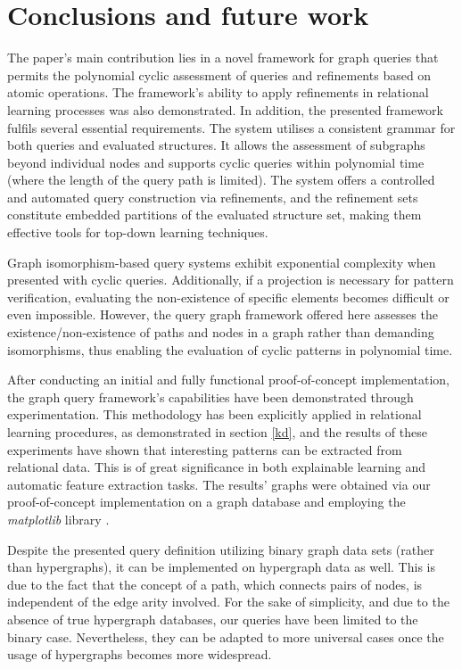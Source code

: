 \documentclass{article}%
\begin{document}
%
\clearpage%
\section{Conclusions and future work}
\label{cafw}

The paper's main contribution lies in a novel framework for graph queries that permits the polynomial cyclic assessment of queries and refinements based on atomic operations. The framework's ability to apply refinements in relational learning processes was also demonstrated. In addition, the presented framework fulfils several essential requirements. The system utilises a consistent grammar for both queries and evaluated structures. It allows the assessment of subgraphs beyond individual nodes and supports cyclic queries within polynomial time (where the length of the query path is limited). The system offers a controlled and automated query construction via refinements, and the refinement sets constitute embedded partitions of the evaluated structure set, making them effective tools for top-down learning techniques.

Graph isomorphism-based query systems exhibit exponential complexity when presented with cyclic queries. Additionally, if a projection is necessary for pattern verification, evaluating the non-existence of specific elements becomes difficult or even impossible. However, the query graph framework offered here assesses the existence/non-existence of paths and nodes in a graph rather than demanding isomorphisms, thus enabling the evaluation of cyclic patterns in polynomial time. 

After conducting an initial and fully functional proof-of-concept implementation, the graph query framework's capabilities have been demonstrated through experimentation. This methodology has been explicitly applied in relational learning procedures, as demonstrated in section \ref{kd}, and the results of these experiments have shown that interesting patterns can be extracted from relational data. This is of great significance in both explainable learning and automatic feature extraction tasks. The results' graphs were obtained via our proof-of-concept implementation on a graph database and employing the \textit{matplotlib} library \citep{hunter}.

Despite the presented query definition utilizing binary graph data sets (rather than hypergraphs), it can be implemented on hypergraph data as well. This is due to the fact that the concept of a path, which connects pairs of nodes, is independent of the edge arity involved. For the sake of simplicity, and due to the absence of true hypergraph databases, our queries have been limited to the binary case. Nevertheless, they can be adapted to more universal cases once the usage of hypergraphs becomes more widespread.
\end{document}
